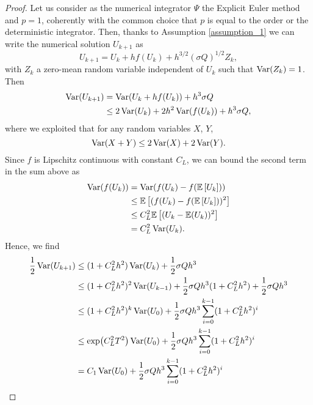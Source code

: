 \begin{proof} Let us consider as the numerical integrator $\Psi$ the Explicit Euler method and $p = 1$, coherently with the common choice that $p$ is equal to the order or the deterministic integrator. Then, thanks to Assumption \ref{assumption_1} we can write the numerical solution $U_{k+1}$ as
\begin{equation}
	U_{k+1} = U_k + hf(U_k) + h^{3/2}(\sigma Q)^{1/2} Z_k,
\end{equation}
with $Z_k$ a zero-mean random variable independent of $U_k$ such that $\operatorname{Var}(Z_k) = 1$. Then
\begin{equation}\label{eq:indepProof}
	\begin{aligned}
		\operatorname{Var}(U_{k+1}) &= \operatorname{Var}(U_k + hf(U_k)) + h^3\sigma Q \\
		&\leq 2\operatorname{Var}(U_k) + 2h^2 \operatorname{Var}(f(U_k)) + h^3\sigma Q,
	\end{aligned}
\end{equation}
where we exploited that for any random variables $X$, $Y$,
\begin{equation}\label{eq:varProp}
	\operatorname{Var}(X + Y) \leq 2\operatorname{Var}(X) + 2\operatorname{Var}(Y).
\end{equation}
Since $f$ is Lipschitz continuous with constant $C_L$, we can bound the second term in the sum above as
\begin{equation}\label{eq:lipschitzVar}
	\begin{aligned}
		\operatorname{Var}(f(U_k)) &= \operatorname{Var}(f(U_k) - f(\mathbb{E}\left[U_k\right])) \\
		&\leq \mathbb{E}\left[(f(U_k) - f(\mathbb{E}\left[U_k\right]))^2\right] \\
		&\leq C_L^2\mathbb{E}\left[(U_k - \mathbb{E}(U_k))^2\right] \\
		&= C_L^2 \operatorname{Var}(U_k).
	\end{aligned}
\end{equation}
Hence, we find
\begin{equation}
\begin{aligned}
	\frac{1}{2}\Var(U_{k+1}) &\leq (1 + C_L^2h^2)\Var(U_k) + \frac{1}{2}\sigma Q h^3 \\
	&\leq (1 + C_L^2h^2)^2 \Var(U_{k-1}) + \frac{1}{2}\sigma Q h^3 (1 + C_L^2h^2) + \frac{1}{2}\sigma Q h^3 \\
	&\leq (1 + C_L^2h^2)^k \Var(U_0) + \frac{1}{2}\sigma Q h^3 \sum_{i = 0}^{k - 1}(1 + C_L^2h^2)^i \\
	&\leq \exp(C_L^2T^2) \Var(U_0) + \frac{1}{2}\sigma Q h^3 \sum_{i = 0}^{k - 1}(1 + C_L^2h^2)^i \\
	&= C_1 \Var(U_0) + \frac{1}{2}\sigma Q h^3 \sum_{i = 0}^{k - 1}(1 + C_L^2h^2)^i \\

\end{aligned}
\end{equation}
\end{proof}
